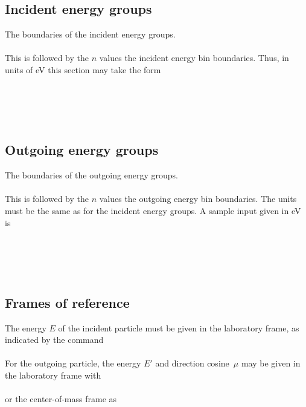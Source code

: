 \subsection{Incident energy groups}\label{Ein-bins}
The boundaries of the incident energy groups.\\
  \\
This is followed by the $n$ values the incident energy bin
boundaries.  Thus, in units of eV this section may take the form\\
  \\
  \\ 
  \\
   \Input{ \indent $\cdots$}{}\\

\subsection{Outgoing energy groups}\label{Eout-bins}
The boundaries of the outgoing energy groups.\\
  \\
This is followed by the $n$ values the outgoing energy bin
boundaries.  The units must be the same as for the incident
energy groups.  A sample input given in eV is\\
  \\
  \\ 
  \\
   \Input{ \indent $\cdots$}{}\\

\subsection{Frames of reference}\label{Reference-frame}
The energy $E$ of the incident particle must be given in the laboratory frame,
as indicated by the command\\
  \\
For the outgoing particle, the energy $E'$ and direction cosine~$\mu$
may be given in the laboratory frame with\\
  \\
or the center-of-mass frame as\\

